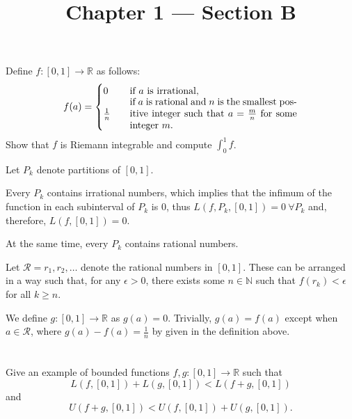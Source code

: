 \documentclass[11pt, a4paper, tikz]{article}
\newcommand{\centsection}[1]{
	\section*{\centering{#1}}
}
\newcommand{\Int}[2]{\displaystyle \int_{#1}^{#2}}
\newcommand{\naturals}{
	\ensuremath{\mathbb{N}}
}
\newcommand{\reals}{
	\ensuremath{\mathbb{R}}
}
\begin{document}
	\title{\textbf{Chapter 1 — Section B}}
	\maketitle
	\centsection{Exercise 1}
	
	\begin{formulationBox}
		Define $f:[0,1]\rightarrow\reals$ as follows:
		\[
			f(a) =
			\begin{cases}
				0 &\quad \textrm{if $a$ is irrational,}\\
				\frac{1}{n} &\quad \parbox{.5\linewidth}{if $a$ is rational and $n$ is the smallest positive integer such that $a=\frac{m}{n}$ for some integer $m$.}
			\end{cases}
		\]
		Show that $f$ is Riemann integrable and compute $\Int{0}{1}f$.
	\end{formulationBox}
	
	Let $P_k$ denote partitions of $[0,1]$.
	
	Every $P_k$ contains irrational numbers, which implies that the infimum of the function in each subinterval of $P_k$ is 0, thus $L(f, P_k, [0,1]) = 0\ \forall P_k$ and, therefore, $L(f, [0,1]) = 0$.
	
	At the same time, every $P_k$ contains rational numbers.
	
	Let $\mathcal{R} = r_1, r_2, \dots$ denote the rational numbers in $[0, 1]$. These can be arranged in a way such that, for any $\epsilon>0$, there exists some $n\in\naturals$ such that $f(r_k)<\epsilon$ for all $k\geq n$.
	
	We define $g:[0,1]\rightarrow\reals$ as $g(a) = 0$. Trivially, $g(a)=f(a)$ except when $a\in\mathcal{R}$, where $g(a)-f(a) = \frac{1}{n}$ by given in the definition above.
	
	
	
	\centsection{Exercise 4}
	
	\begin{formulationBox}
		Give an example of bounded functions $f, g:[0,1]\rightarrow\reals$ such that \[L(f, [0,1]) + L(g, [0,1]) < L(f+g,[0,1])\] and \[U(f+g,[0,1]) < U(f, [0,1]) + U(g, [0,1]).\]
	\end{formulationBox}
	
\end{document}
